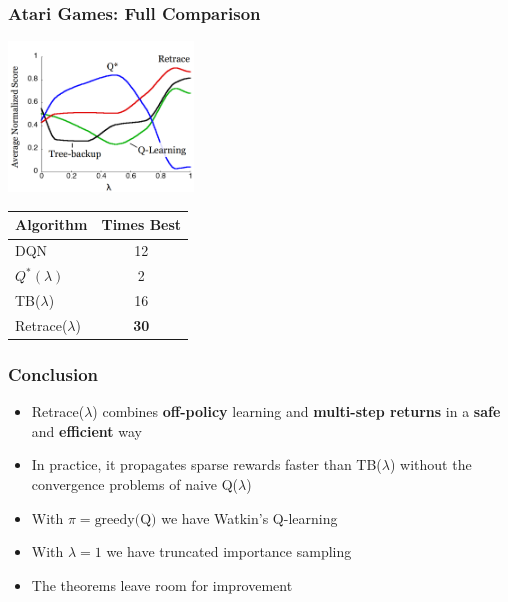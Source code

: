 \documentclass{beamer}
\begin{document}
\begin{frame}
\frametitle{Atari Games: Full Comparison} 
\begin{minipage}[b]{.5\textwidth}
\includegraphics[height=4cm]{images/atari2}
\end{minipage}%
\begin{minipage}[b]{.5\textwidth}
\begin{tabular}{lc}
\toprule
Algorithm & Times Best \\
\midrule
DQN & 12 \\
$Q^*(\lambda)$ & 2 \\
TB($\lambda$) & 16 \\
Retrace($\lambda$) & \textbf{30} \\
\bottomrule
\end{tabular}
\end{minipage}
\end{frame}

\begin{frame}
\frametitle{Conclusion}
\begin{itemize}
\item Retrace($\lambda$) combines \textbf{off-policy} learning and \textbf{multi-step returns} in a \textbf{safe} and \textbf{efficient} way
\item In practice, it propagates sparse rewards faster than TB($\lambda$) without the convergence problems of naive Q($\lambda$)
\item With $\pi=\text{greedy(Q)}$ we have Watkin's Q-learning
\item With $\lambda=1$ we have truncated importance sampling
\item The theorems leave room for improvement
\end{itemize}
\end{frame}
\end{document}
